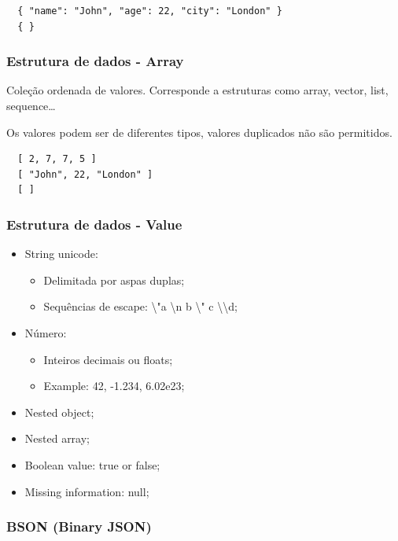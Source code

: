 \documentclass{article}
\begin{document}
\begin{lstlisting}
  { "name": "John", "age": 22, "city": "London" }
  { }
\end{lstlisting}

\subsubsection*{Estrutura de dados - Array}

Coleção ordenada de valores. Corresponde a estruturas como array, vector, list, sequence\dots

Os valores podem ser de diferentes tipos, valores duplicados não são permitidos.

\begin{lstlisting}
  [ 2, 7, 7, 5 ]
  [ "John", 22, "London" ]
  [ ]
\end{lstlisting}

\pagebreak

\subsubsection*{Estrutura de dados - Value}

\begin{itemize}
  \item String unicode:
  \begin{itemize}
    \item Delimitada por aspas duplas;
    \item Sequências de escape: \textbackslash "a \textbackslash n b \textbackslash " c \textbackslash \textbackslash d;
  \end{itemize}

  \item Número:
  \begin{itemize}
    \item Inteiros decimais ou floats;
    \item Example: 42, -1.234, 6.02e23;
  \end{itemize}

  \item Nested object;
  \item Nested array;
  \item Boolean value: true or false;
  \item Missing information: null;
\end{itemize}

\subsubsection{BSON (Binary JSON)}
\end{document}
